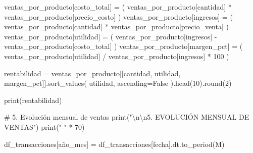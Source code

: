 \documentclass[
  doc,
  floatsintext,
  longtable,
  a4paper,
  nolmodern,
  notxfonts,
  notimes,
  12pt,
  colorlinks=true,linkcolor=blue,citecolor=blue,urlcolor=blue]{apa7}
\newenvironment{Shaded}{\begin{snugshade}}{\end{snugshade}}
\newcommand{\BuiltInTok}[1]{\textcolor[rgb]{0.00,0.23,0.31}{#1}}
\newcommand{\CharTok}[1]{\textcolor[rgb]{0.13,0.47,0.30}{#1}}
\newcommand{\CommentTok}[1]{\textcolor[rgb]{0.37,0.37,0.37}{#1}}
\newcommand{\DecValTok}[1]{\textcolor[rgb]{0.68,0.00,0.00}{#1}}
\newcommand{\NormalTok}[1]{\textcolor[rgb]{0.00,0.23,0.31}{#1}}
\newcommand{\OperatorTok}[1]{\textcolor[rgb]{0.37,0.37,0.37}{#1}}
\newcommand{\StringTok}[1]{\textcolor[rgb]{0.13,0.47,0.30}{#1}}
\newcommand{\VariableTok}[1]{\textcolor[rgb]{0.07,0.07,0.07}{#1}}
\begin{document}
\begin{Shaded}
\begin{Highlighting}[]
\NormalTok{ventas\_por\_producto[}\StringTok{\textquotesingle{}costo\_total\textquotesingle{}}\NormalTok{] }\OperatorTok{=}\NormalTok{ (}
\NormalTok{    ventas\_por\_producto[}\StringTok{\textquotesingle{}cantidad\textquotesingle{}}\NormalTok{] }\OperatorTok{*}\NormalTok{ ventas\_por\_producto[}\StringTok{\textquotesingle{}precio\_costo\textquotesingle{}}\NormalTok{]}
\NormalTok{)}
\NormalTok{ventas\_por\_producto[}\StringTok{\textquotesingle{}ingresos\textquotesingle{}}\NormalTok{] }\OperatorTok{=}\NormalTok{ (}
\NormalTok{    ventas\_por\_producto[}\StringTok{\textquotesingle{}cantidad\textquotesingle{}}\NormalTok{] }\OperatorTok{*}\NormalTok{ ventas\_por\_producto[}\StringTok{\textquotesingle{}precio\_venta\textquotesingle{}}\NormalTok{]}
\NormalTok{)}
\NormalTok{ventas\_por\_producto[}\StringTok{\textquotesingle{}utilidad\textquotesingle{}}\NormalTok{] }\OperatorTok{=}\NormalTok{ (}
\NormalTok{    ventas\_por\_producto[}\StringTok{\textquotesingle{}ingresos\textquotesingle{}}\NormalTok{] }\OperatorTok{{-}}\NormalTok{ ventas\_por\_producto[}\StringTok{\textquotesingle{}costo\_total\textquotesingle{}}\NormalTok{]}
\NormalTok{)}
\NormalTok{ventas\_por\_producto[}\StringTok{\textquotesingle{}margen\_pct\textquotesingle{}}\NormalTok{] }\OperatorTok{=}\NormalTok{ (}
\NormalTok{    ventas\_por\_producto[}\StringTok{\textquotesingle{}utilidad\textquotesingle{}}\NormalTok{] }\OperatorTok{/}\NormalTok{ ventas\_por\_producto[}\StringTok{\textquotesingle{}ingresos\textquotesingle{}}\NormalTok{] }\OperatorTok{*} \DecValTok{100}
\NormalTok{)}

\NormalTok{rentabilidad }\OperatorTok{=}\NormalTok{ ventas\_por\_producto[[}\StringTok{\textquotesingle{}cantidad\textquotesingle{}}\NormalTok{, }\StringTok{\textquotesingle{}utilidad\textquotesingle{}}\NormalTok{, }\StringTok{\textquotesingle{}margen\_pct\textquotesingle{}}\NormalTok{]].sort\_values(}
    \StringTok{\textquotesingle{}utilidad\textquotesingle{}}\NormalTok{, ascending}\OperatorTok{=}\VariableTok{False}
\NormalTok{).head(}\DecValTok{10}\NormalTok{).}\BuiltInTok{round}\NormalTok{(}\DecValTok{2}\NormalTok{)}

\BuiltInTok{print}\NormalTok{(rentabilidad)}

\CommentTok{\# 5. Evolución mensual de ventas}
\BuiltInTok{print}\NormalTok{(}\StringTok{"}\CharTok{\textbackslash{}n\textbackslash{}n}\StringTok{5. EVOLUCIÓN MENSUAL DE VENTAS"}\NormalTok{)}
\BuiltInTok{print}\NormalTok{(}\StringTok{"{-}"} \OperatorTok{*} \DecValTok{70}\NormalTok{)}

\NormalTok{df\_transacciones[}\StringTok{\textquotesingle{}año\_mes\textquotesingle{}}\NormalTok{] }\OperatorTok{=}\NormalTok{ df\_transacciones[}\StringTok{\textquotesingle{}fecha\textquotesingle{}}\NormalTok{].dt.to\_period(}\StringTok{\textquotesingle{}M\textquotesingle{}}\NormalTok{)}


\end{Highlighting}
\end{Shaded}
\end{document}
